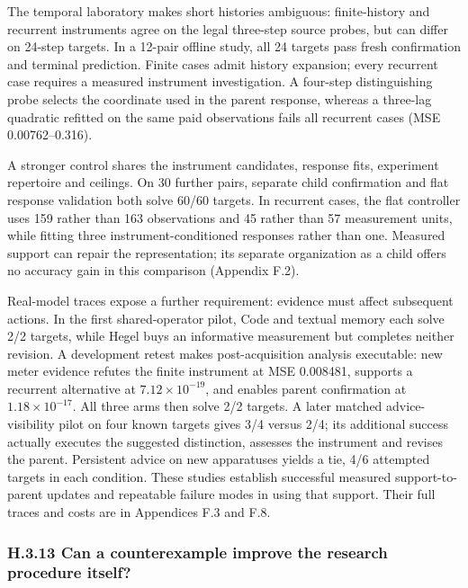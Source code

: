 \documentclass[twoside,11pt]{article}
\begin{document}
The temporal laboratory makes short histories ambiguous: finite-history and
recurrent instruments agree on the legal three-step source probes, but can differ
on 24-step targets. In a 12-pair offline study, all 24 targets pass fresh
confirmation and terminal prediction. Finite cases admit history expansion;
every recurrent case requires a measured instrument investigation. A four-step
distinguishing probe selects the coordinate used in the parent response, whereas
a three-lag quadratic refitted on the same paid observations fails all recurrent
cases (MSE 0.00762–0.316).


A stronger control shares the instrument candidates, response fits, experiment
repertoire and ceilings. On 30 further pairs, separate child confirmation and
flat response validation both solve 60/60 targets. In recurrent cases, the flat
controller uses 159 rather than 163 observations and 45 rather than 57 measurement
units, while fitting three instrument-conditioned responses rather than one.
Measured support can repair the representation; its separate organization as a
child offers no accuracy gain in this comparison (Appendix F.2).


Real-model traces expose a further requirement: evidence must affect subsequent
actions. In the first shared-operator pilot, Code and textual memory each solve
2/2 targets, while Hegel buys an informative measurement but completes neither
revision. A development retest makes post-acquisition analysis executable: new
meter evidence refutes the finite instrument at MSE 0.008481, supports a recurrent
alternative at \(7.12\times10^{-19}\), and enables parent confirmation at
\(1.18\times10^{-17}\). All three arms then solve 2/2 targets. A later matched
advice-visibility pilot on four known targets gives 3/4 versus 2/4; its additional
success actually executes the suggested distinction, assesses the instrument
and revises the parent. Persistent advice on new apparatuses yields a tie,
4/6 attempted targets in each condition. These studies establish successful
measured support-to-parent updates and repeatable failure modes in using that
support. Their full traces and costs are in Appendices F.3 and F.8.


\subsubsection*{H.3.13 Can a counterexample improve the research procedure itself?}
\end{document}
